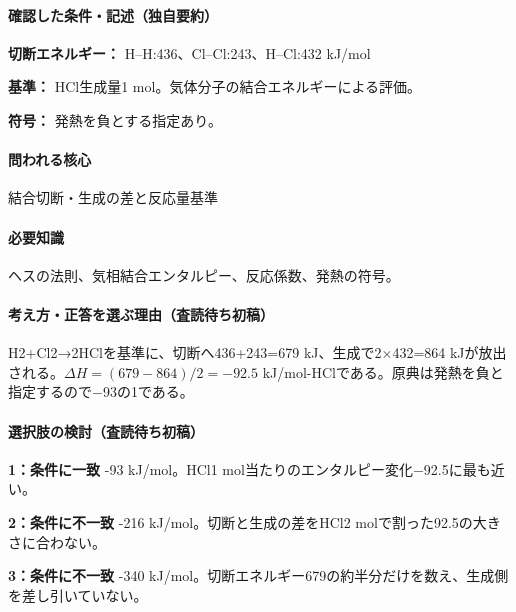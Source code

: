 \paragraph{確認した条件・記述（独自要約）}\mbox{}\par

\noindent\textbf{切断エネルギー：} H–H:436、Cl–Cl:243、H–Cl:432 kJ/mol\par

\noindent\textbf{基準：} HCl生成量1 mol。気体分子の結合エネルギーによる評価。\par

\noindent\textbf{符号：} 発熱を負とする指定あり。\par

\paragraph{問われる核心} 結合切断・生成の差と反応量基準

\paragraph{必要知識} ヘスの法則、気相結合エンタルピー、反応係数、発熱の符号。

\paragraph{考え方・正答を選ぶ理由（査読待ち初稿）} H2+Cl2→2HClを基準に、切断へ436+243=\allowbreak{}679 kJ、生成で2×432=\allowbreak{}864 kJが放出される。\(\Delta H=(679-864)/2=-92.5\) kJ/mol-HClである。原典は発熱を負と指定するので−93の1である。

\paragraph{選択肢の検討（査読待ち初稿）}\mbox{}\par

\noindent\textbf{1：条件に一致} -93 kJ/mol。HCl1 mol当たりのエンタルピー変化−92.5に最も近い。\par

\noindent\textbf{2：条件に不一致} -216 kJ/mol。切断と生成の差をHCl2 molで割った92.5の大きさに合わない。\par

\noindent\textbf{3：条件に不一致} -340 kJ/mol。切断エネルギー679の約半分だけを数え、生成側を差し引いていない。\par

